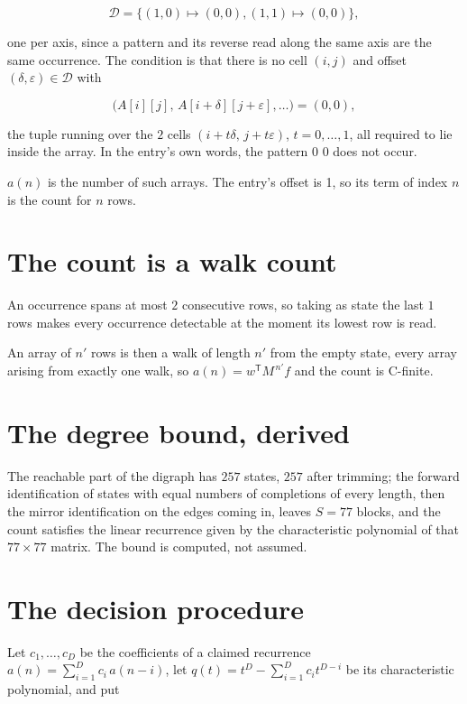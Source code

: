 \documentclass[11pt]{article}
\theoremstyle{definition}
\begin{document}
\[\mathcal{D} = \{(1,0)\mapsto(0,0), (1,1)\mapsto(0,0)\},\]

one per axis, since a pattern and its reverse read along the same axis are the same occurrence. The condition is that there is no cell $(i,j)$ and offset $(\delta,\varepsilon)\in\mathcal{D}$ with

\[\bigl(A[i][j],\,A[i{+}\delta][j{+}\varepsilon],\dots\bigr) = (0, 0),\]

the tuple running over the $2$ cells $(i+t\delta,\,j+t\varepsilon)$, $t = 0,\dots,1$, all required to lie inside the array. In the entry's own words, the pattern 0 0 does not occur.

$a(n)$ is the number of such arrays. The entry's offset is 1, so its term of index $n$ is the count for $n$ rows.

\section{The count is a walk count}

An occurrence spans at most $2$ consecutive rows, so taking as state the last $1$ rows makes every occurrence detectable at the moment its lowest row is read.

An array of $n'$ rows is then a walk of length $n'$ from the empty state, every array arising from exactly one walk, so $a(n) = w^{\mathsf T}M^{\,n'}f$ and the count is C-finite.

\section{The degree bound, derived}

The reachable part of the digraph has $257$ states, $257$ after trimming; the forward identification of states with equal numbers of completions of every length, then the mirror identification on the edges coming in, leaves $S = 77$ blocks, and the count satisfies the linear recurrence given by the characteristic polynomial of that $77\times77$ matrix. The bound is computed, not assumed.

\section{The decision procedure}

Let $c_1,\dots,c_D$ be the coefficients of a claimed recurrence $a(n) = \sum_{i=1}^{D} c_i\,a(n-i)$, let $q(t) = t^{D} - \sum_{i=1}^{D} c_i t^{D-i}$ be its characteristic polynomial, and put
\end{document}
